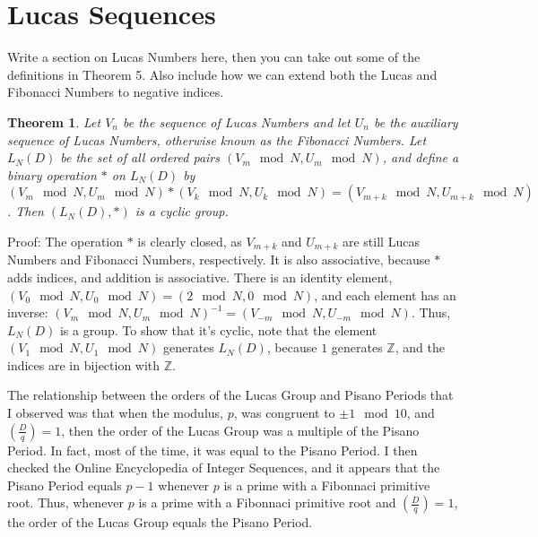 \documentclass{article}
\newtheorem{theorem}{Theorem}
\newcommand{\legendre}[2]{\genfrac{(}{)}{}{}{#1}{#2}}
\begin{document}
\section{Lucas Sequences}

Write a section on Lucas Numbers here, then you can take out some of the definitions in Theorem 5. Also include how we can extend both the Lucas and Fibonacci Numbers to negative indices.

\begin{theorem}
    Let $V_n$ be the sequence of Lucas Numbers and let $U_n$ be the auxiliary sequence of Lucas Numbers, otherwise known as the Fibonacci Numbers. Let $L_N(D)$ be the set of all ordered pairs $(V_m \mod N, U_m \mod N)$, and define a binary operation $*$ on $L_N(D)$ by $(V_m \mod N, U_m \mod N)*(V_k \mod N, U_k \mod N) = (V_{m+k} \mod N, U_{m+k} \mod N)$. Then $(L_N(D), *)$ is a cyclic group.
\end{theorem}

Proof: The operation $*$ is clearly closed, as $V_{m+k}$ and $U_{m+k}$ are still Lucas Numbers and Fibonacci Numbers, respectively. It is also associative, because $*$ adds indices, and addition is associative. There is an identity element, $(V_0 \mod N,U_0 \mod N) = (2 \mod N,0 \mod N)$, and each element has an inverse: $(V_m \mod N, U_m \mod N)^{-1} = (V_{-m} \mod N, U_{-m} \mod N)$. Thus, $L_N(D)$ is a group. To show that it's cyclic, note that the element $(V_1 \mod N, U_1 \mod N)$ generates $L_N(D)$, because $1$ generates $\mathbb{Z}$, and the indices are in bijection with $\mathbb{Z}$.

The relationship between the orders of the Lucas Group and Pisano Periods that I observed was that when the modulus, $p$, was congruent to $\pm 1 \mod 10$, and $\legendre{D}{q} = 1$, then the order of the Lucas Group was a multiple of the Pisano Period. In fact, most of the time, it was equal to the Pisano Period. I then checked the Online Encyclopedia of Integer Sequences, and it appears that the Pisano Period equals $p-1$ whenever $p$ is a prime with a Fibonnaci primitive root. Thus, whenever $p$ is a prime with a Fibonnaci primitive root and $\legendre{D}{q} = 1$, the order of the Lucas Group equals the Pisano Period.
\end{document}
